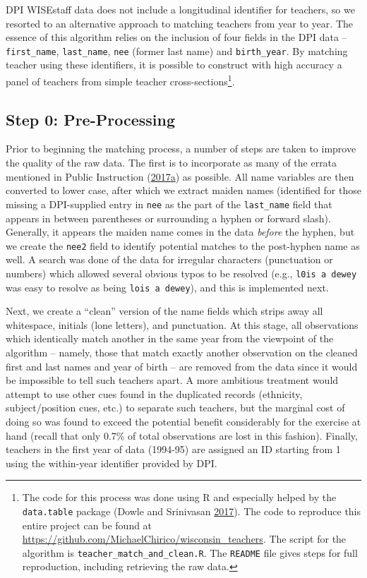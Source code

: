 \documentclass[12pt,]{article}
\let\rmarkdownfootnote\footnote%
\def\footnote{\protect\rmarkdownfootnote}
\begin{document}
DPI WISEstaff data does not include a longitudinal identifier for
teachers, so we resorted to an alternative approach to matching teachers
from year to year. The essence of this algorithm relies on the inclusion
of four fields in the DPI data -- \texttt{first\_name},
\texttt{last\_name}, \texttt{nee} (former last name) and
\texttt{birth\_year}. By matching teacher using these identifiers, it is
possible to construct with high accuracy a panel of teachers from simple
teacher cross-sections\footnote{The code for this process was done using
  R and especially helped by the \texttt{data.table} package (Dowle and
  Srinivasan \protect\hyperlink{ref-dowle}{2017}). The code to reproduce
  this entire project can be found at
  \url{https://github.com/MichaelChirico/wisconsin_teachers}. The script
  for the algorithm is \texttt{teacher\_match\_and\_clean.R}. The
  \texttt{README} file gives steps for full reproduction, including
  retrieving the raw data.}.

\subsection{Step 0: Pre-Processing}\label{step-0-pre-processing}

Prior to beginning the matching process, a number of steps are taken to
improve the quality of the raw data. The first is to incorporate as many
of the errata mentioned in Public Instruction
(\protect\hyperlink{ref-dpi_errata}{2017}\protect\hyperlink{ref-dpi_errata}{a})
as possible. All name variables are then converted to lower case, after
which we extract maiden names (identified for those missing a
DPI-supplied entry in \texttt{nee} as the part of the
\texttt{last\_name} field that appears in between parentheses or
surrounding a hyphen or forward slash). Generally, it appears the maiden
name comes in the data \emph{before} the hyphen, but we create the
\texttt{nee2} field to identify potential matches to the post-hyphen
name as well. A search was done of the data for irregular characters
(punctuation or numbers) which allowed several obvious typos to be
resolved (e.g., \texttt{l0is\ a\ dewey} was easy to resolve as being
\texttt{lois\ a\ dewey}), and this is implemented next.

Next, we create a ``clean'' version of the name fields which strips away
all whitespace, initials (lone letters), and punctuation. At this stage,
all observations which identically match another in the same year from
the viewpoint of the algorithm -- namely, those that match exactly
another observation on the cleaned first and last names and year of
birth -- are removed from the data since it would be impossible to tell
such teachers apart. A more ambitious treatment would attempt to use
other cues found in the duplicated records (ethnicity, subject/position
cues, etc.) to separate such teachers, but the marginal cost of doing so
was found to exceed the potential benefit considerably for the exercise
at hand (recall that only 0.7\% of total observations are lost in this
fashion). Finally, teachers in the first year of data (1994-95) are
assigned an ID starting from 1 using the within-year identifier provided
by DPI.
\end{document}
